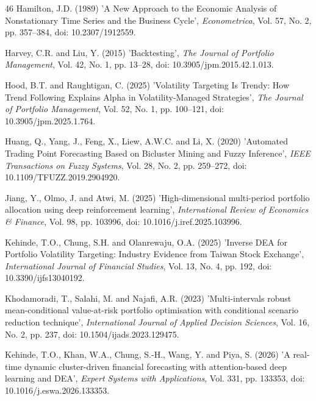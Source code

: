 \documentclass{singlecol-new}
\theoremstyle{TH}{
\newtheorem{lemma}{Lemma}
\newtheorem{theorem}[lemma]{Theorem}
\newtheorem{corrolary}[lemma]{Corrolary}
\newtheorem{conjecture}[lemma]{Conjecture}
\newtheorem{proposition}[lemma]{Proposition}
\newtheorem{claim}[lemma]{Claim}
\newtheorem{stheorem}[lemma]{Wrong Theorem}
\newtheorem{algorithm}{Algorithm}
}
\theoremstyle{THrm}{
\newtheorem{definition}{Definition}[section]
\newtheorem{question}{Question}[section]
\newtheorem{remark}{Remark}
\newtheorem{scheme}{Scheme}
}
\theoremstyle{THhit}{
\newtheorem{case}{Case}[section]
}
\begin{document}
\begin{thebibliography}{46}
Hamilton, J.D. (1989) 'A New Approach to the Economic Analysis of Nonstationary Time Series and the Business Cycle', {\it Econometrica}, Vol. 57, No. 2, pp. 357--384, doi: 10.2307/1912559.

Harvey, C.R. and Liu, Y. (2015) 'Backtesting', {\it The Journal of Portfolio Management}, Vol. 42, No. 1, pp. 13--28, doi: 10.3905/jpm.2015.42.1.013.

Hood, B.T. and Raughtigan, C. (2025) 'Volatility Targeting Is Trendy: How Trend Following Explains Alpha in Volatility-Managed Strategies', {\it The Journal of Portfolio Management}, Vol. 52, No. 1, pp. 100--121, doi: 10.3905/jpm.2025.1.764.

Huang, Q., Yang, J., Feng, X., Liew, A.W.C. and Li, X. (2020) 'Automated Trading Point Forecasting Based on Bicluster Mining and Fuzzy Inference', {\it IEEE Transactions on Fuzzy Systems}, Vol. 28, No. 2, pp. 259--272, doi: 10.1109/TFUZZ.2019.2904920.

Jiang, Y., Olmo, J. and Atwi, M. (2025) 'High-dimensional multi-period portfolio allocation using deep reinforcement learning', {\it International Review of Economics \& Finance}, Vol. 98, pp. 103996, doi: 10.1016/j.iref.2025.103996.

Kehinde, T.O., Chung, S.H. and Olanrewaju, O.A. (2025) 'Inverse DEA for Portfolio Volatility Targeting: Industry Evidence from Taiwan Stock Exchange', {\it International Journal of Financial Studies}, Vol. 13, No. 4, pp. 192, doi: 10.3390/ijfs13040192.

Khodamoradi, T., Salahi, M. and Najafi, A.R. (2023) 'Multi-intervals robust mean-conditional value-at-risk portfolio optimisation with conditional scenario reduction technique', {\it International Journal of Applied Decision Sciences}, Vol. 16, No. 2, pp. 237, doi: 10.1504/ijads.2023.129475.

Kehinde, T.O., Khan, W.A., Chung, S.-H., Wang, Y. and Piya, S. (2026) 'A real-time dynamic cluster-driven financial forecasting with attention-based deep learning and DEA', {\it Expert Systems with Applications}, Vol. 331, pp. 133353, doi: 10.1016/j.eswa.2026.133353.


\end{thebibliography}
\end{document}
